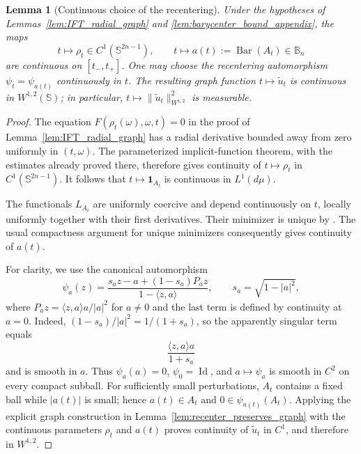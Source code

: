 \documentclass[11pt]{amsart}
\theoremstyle{plain}
\newtheorem{lemma}[theorem]{Lemma}
\theoremstyle{definition}
\theoremstyle{remark}
\newcommand{\B}{\mathbb{B}}
\newcommand{\Sn}{\mathbb{S}^{2n-1}}
\newcommand{\Sph}{\mathbb{S}}
\begin{document}
\begin{lemma}[Continuous choice of the recentering]\label{lem:measurable_recentering}
Under the hypotheses of Lemmas~\ref{lem:IFT_radial_graph} and
\ref{lem:barycenter_bound_appendix}, the maps
\[
 t\longmapsto \rho_t\in C^1(\Sn),
 \qquad t\longmapsto a(t):=\operatorname{Bar}(A_t)\in\B_n
\]
are continuous on $[t_-,t_+]$. One may choose the recentering automorphism
$\psi_t=\psi_{a(t)}$ continuously in $t$. The resulting graph function
$t\mapsto\widetilde u_t$ is continuous in $W^{1,2}(\Sph)$; in particular,
$t\mapsto\|\widetilde u_t\|_{W^{1,2}}^2$ is measurable.
\end{lemma}

\begin{proof}
The equation $F(\rho_t(\omega),\omega,t)=0$ in the proof of
Lemma~\ref{lem:IFT_radial_graph} has a radial derivative bounded away from
zero uniformly in $(t,\omega)$. The parameterized implicit-function theorem,
with the estimates already proved there, therefore gives continuity of
$t\mapsto\rho_t$ in $C^1(\Sn)$. It follows that
$t\mapsto\mathbf1_{A_t}$ is continuous in $L^1(d\mu)$.

The functionals $L_{A_t}$ are uniformly coercive and depend continuously on
$t$, locally uniformly together with their first derivatives. Their minimizer
is unique by \cite[Theorem~5.1]{JacimovicKalajAnnFennMath}. The usual compactness
argument for unique minimizers consequently gives continuity of $a(t)$.

For clarity, we use the canonical automorphism
\begin{equation}\label{eq:canonical_automorphism}
 \psi_a(z)=\frac{s_a z-a+(1-s_a)P_a z}{1-\langle z,a\rangle},
 \qquad s_a=\sqrt{1-|a|^2},
\end{equation}
where $P_a z=\langle z,a\rangle a/|a|^2$ for $a\ne0$ and the last term is
defined by continuity at $a=0$. Indeed,
$(1-s_a)/|a|^2=1/(1+s_a)$, so the apparently singular term equals
\[
 \frac{\langle z,a\rangle a}{1+s_a}
\]
and is smooth in $a$. Thus $\psi_a(a)=0$, $\psi_0=\operatorname{Id}$, and
$a\mapsto\psi_a$ is smooth in $C^2$ on every compact subball. For sufficiently
small perturbations, $A_t$ contains a fixed ball while $|a(t)|$ is small;
hence $a(t)\in A_t$ and $0\in\psi_{a(t)}(A_t)$. Applying the explicit graph
construction in Lemma~\ref{lem:recenter_preserves_graph} with the continuous
parameters $\rho_t$ and $a(t)$ proves continuity of $\widetilde u_t$ in
$C^1$, and therefore in $W^{1,2}$.
\end{proof}
\end{document}
